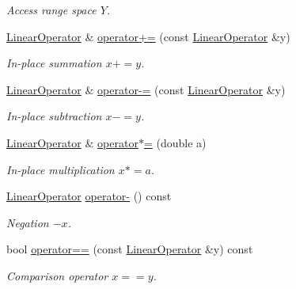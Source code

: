 \begin{DoxyCompactItemize}
\begin{DoxyCompactList}\small\item\em \-Access range space $Y$. \end{DoxyCompactList}\item 
\hyperlink{classSpacy_1_1Rn_1_1LinearOperator}{\-Linear\-Operator} \& \hyperlink{classSpacy_1_1AddArithmeticOperators_afad1d01e1e8c6f75290ac46d9b047ea8}{operator+=} (const \hyperlink{classSpacy_1_1Rn_1_1LinearOperator}{\-Linear\-Operator} \&y)
\begin{DoxyCompactList}\small\item\em \-In-\/place summation $ x+=y$. \end{DoxyCompactList}\item 
\hyperlink{classSpacy_1_1Rn_1_1LinearOperator}{\-Linear\-Operator} \& \hyperlink{classSpacy_1_1AddArithmeticOperators_a9fa91e177d13203cfe8cfa991c64ca36}{operator-\/=} (const \hyperlink{classSpacy_1_1Rn_1_1LinearOperator}{\-Linear\-Operator} \&y)
\begin{DoxyCompactList}\small\item\em \-In-\/place subtraction $ x-=y$. \end{DoxyCompactList}\item 
\hyperlink{classSpacy_1_1Rn_1_1LinearOperator}{\-Linear\-Operator} \& \hyperlink{classSpacy_1_1AddArithmeticOperators_a1d3db95b24fd2bc1de712c9e04c47e2f}{operator$\ast$=} (double a)
\begin{DoxyCompactList}\small\item\em \-In-\/place multiplication $ x*=a$. \end{DoxyCompactList}\item 
\hyperlink{classSpacy_1_1Rn_1_1LinearOperator}{\-Linear\-Operator} \hyperlink{classSpacy_1_1AddArithmeticOperators_a5acd030bf265d130983fd6e3c5b68be5}{operator-\/} () const
\begin{DoxyCompactList}\small\item\em \-Negation $ -x$. \end{DoxyCompactList}\item 
bool \hyperlink{classSpacy_1_1AddArithmeticOperators_a5ff1909f49f4a705d69663dc2d4b6316}{operator==} (const \hyperlink{classSpacy_1_1Rn_1_1LinearOperator}{\-Linear\-Operator} \&y) const
\begin{DoxyCompactList}\small\item\em \-Comparison operator $ x==y$. \end{DoxyCompactList}\end{DoxyCompactItemize}


